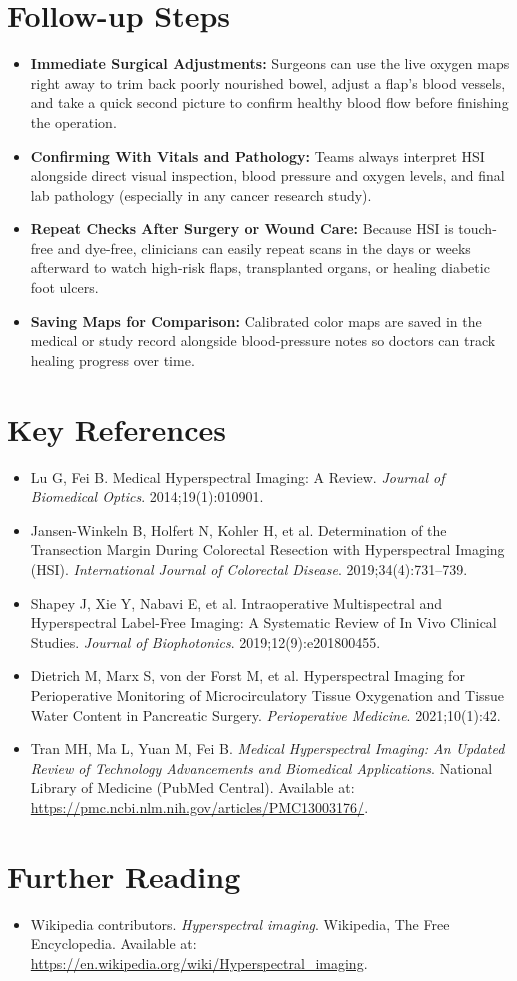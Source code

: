 \section{Follow-up Steps}
\begin{itemize}
    \item \textbf{Immediate Surgical Adjustments:} Surgeons can use the live oxygen maps right away to trim back poorly nourished bowel, adjust a flap's blood vessels, and take a quick second picture to confirm healthy blood flow before finishing the operation.
    \item \textbf{Confirming With Vitals and Pathology:} Teams always interpret HSI alongside direct visual inspection, blood pressure and oxygen levels, and final lab pathology (especially in any cancer research study).
    \item \textbf{Repeat Checks After Surgery or Wound Care:} Because HSI is touch-free and dye-free, clinicians can easily repeat scans in the days or weeks afterward to watch high-risk flaps, transplanted organs, or healing diabetic foot ulcers.
    \item \textbf{Saving Maps for Comparison:} Calibrated color maps are saved in the medical or study record alongside blood-pressure notes so doctors can track healing progress over time.
\end{itemize}

\section{Key References}
\begin{itemize}
    \item Lu G, Fei B. Medical Hyperspectral Imaging: A Review. \textit{Journal of Biomedical Optics}. 2014;19(1):010901.
    \item Jansen-Winkeln B, Holfert N, Kohler H, et al. Determination of the Transection Margin During Colorectal Resection with Hyperspectral Imaging (HSI). \textit{International Journal of Colorectal Disease}. 2019;34(4):731--739.
    \item Shapey J, Xie Y, Nabavi E, et al. Intraoperative Multispectral and Hyperspectral Label-Free Imaging: A Systematic Review of In Vivo Clinical Studies. \textit{Journal of Biophotonics}. 2019;12(9):e201800455.
    \item Dietrich M, Marx S, von der Forst M, et al. Hyperspectral Imaging for Perioperative Monitoring of Microcirculatory Tissue Oxygenation and Tissue Water Content in Pancreatic Surgery. \textit{Perioperative Medicine}. 2021;10(1):42.
    \item Tran MH, Ma L, Yuan M, Fei B. \textit{Medical Hyperspectral Imaging: An Updated Review of Technology Advancements and Biomedical Applications}. National Library of Medicine (PubMed Central). Available at: \url{https://pmc.ncbi.nlm.nih.gov/articles/PMC13003176/}.
\end{itemize}

\section{Further Reading}
\begin{itemize}
  \item Wikipedia contributors. \textit{Hyperspectral imaging}. Wikipedia, The Free Encyclopedia. Available at: \url{https://en.wikipedia.org/wiki/Hyperspectral_imaging}.
\end{itemize}
